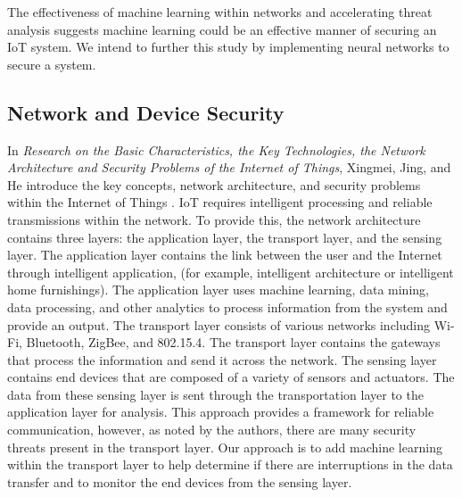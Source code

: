 \documentclass[../main.tex]{subfiles}
\begin{document}
The effectiveness of machine learning within networks and accelerating threat analysis suggests machine learning could be an effective manner of securing an IoT system. We intend to further this study by implementing neural networks to secure a system.  




\subsection{Network and Device Security}

In \textit{Research on the Basic Characteristics, the Key Technologies, the Network Architecture and Security Problems of the Internet of Things}, Xingmei, Jing, and He introduce the key concepts, network architecture, and security problems within the Internet of Things \cite{6967233}. IoT requires intelligent processing and reliable transmissions within the network. To provide this, the network architecture contains three  layers: the application layer, the transport layer, and the sensing layer. The application layer contains the link between the user and the Internet through intelligent application, (for example, intelligent architecture or intelligent home furnishings). The application layer uses machine learning, data mining, data processing, and other analytics to process information from the system and provide an output. The transport layer consists of various networks including Wi-Fi, Bluetooth, ZigBee, and 802.15.4. The transport layer contains the gateways that process the information and send it across the network. The sensing layer contains end devices that are composed of a variety of sensors and actuators. The data from these sensing layer is sent through the transportation layer to the application layer for analysis. 
This approach provides a framework for reliable communication, however, as noted by the authors, there are many security threats present in the transport layer. Our approach is to add machine learning within the transport layer to help determine if there are interruptions in the data transfer and to monitor the end devices from the sensing layer. 
\end{document}
